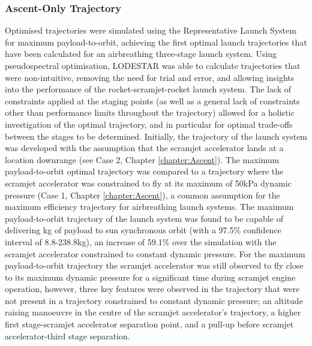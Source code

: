 \subsubsection{Ascent-Only Trajectory}
Optimised trajectories were simulated using the Representative Launch System for maximum payload-to-orbit, achieving the first optimal launch trajectories that have been calculated for an airbreathing three-stage launch system. Using pseudospectral optimisation, LODESTAR was able to calculate trajectories that were non-intuitive, removing the need for trial and error, and allowing insights into the performance of the rocket-scramjet-rocket launch system. The lack of constraints applied at the staging points (as well as a general lack of constraints other than performance limits throughout the trajectory) allowed for a holistic investigation of the optimal trajectory, and in particular for optimal trade-offs between the stages to be determined.
Initially, the trajectory of the launch system was developed with the assumption that the scramjet accelerator lands at a location downrange (see Case 2, Chapter \ref{chapter:Ascent}).
The maximum payload-to-orbit optimal trajectory was compared to a trajectory where the scramjet accelerator was constrained to fly at its maximum of 50kPa dynamic pressure (Case 1, Chapter \ref{chapter:Ascent}), a common assumption for the maximum efficiency trajectory for airbreathing launch systems. 
The maximum payload-to-orbit trajectory of the launch system was found to be capable of delivering \PayloadToOrbitStandardNoReturn kg of payload to sun synchronous orbit (with a 97.5\% confidence interval of 8.8-238.8kg), an increase of 59.1\% over the simulation with the scramjet accelerator constrained to constant dynamic pressure. For the maximum payload-to-orbit trajectory the scramjet accelerator was still observed to fly close to its maximum dynamic pressure for a significant time during scramjet engine operation, however, three key features were observed in the trajectory that were not present in a trajectory constrained to constant dynamic pressure; an altitude raising manoeuvre in the centre of the scramjet accelerator's trajectory, a higher first stage-scramjet accelerator separation point, and a pull-up before scramjet accelerator-third stage separation.


